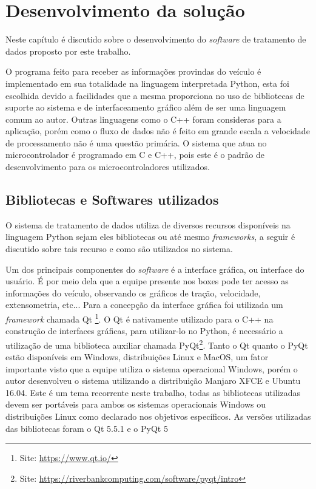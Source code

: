 \chapter{Desenvolvimento da solução}
	\label{ch:desenvolvimento}
Neste capítulo é discutido sobre o desenvolvimento do \textit{software} de tratamento de dados proposto por este trabalho. 

O programa feito para receber as informações provindas do veículo é implementado em sua totalidade na linguagem interpretada Python, esta foi escolhida devido a facilidades que a mesma proporciona no uso de bibliotecas de suporte ao sistema e de interfaceamento gráfico além de ser uma linguagem comum ao autor. Outras linguagens como o C++ foram consideras para a aplicação, porém como o fluxo de dados não é feito em grande escala a velocidade de processamento não é uma questão primária. O sistema que atua no microcontrolador é programado em C e C++, pois este é o padrão de desenvolvimento para os microcontroladores utilizados. 

\section{Bibliotecas e Softwares utilizados}
O sistema de tratamento de dados utiliza de diversos recursos disponíveis na linguagem Python sejam eles bibliotecas ou até mesmo \textit{frameworks}, a seguir é discutido sobre tais recurso e como são utilizados no sistema. 

Um dos principais componentes do \textit{software} é a interface gráfica, ou interface do usuário. É por meio dela que a equipe presente nos boxes pode ter acesso as informações do veículo, observando os gráficos de tração, velocidade, extensometria, etc... Para a concepção da interface gráfica foi utilizada um \textit{framework} chamada Qt \footnote[1]{Site: \url{https://www.qt.io/}}. O Qt é nativamente utilizado para o C++ na construção de interfaces gráficas, para utilizar-lo no Python, é necessário a utilização de uma biblioteca auxiliar chamada PyQt\footnote[2]{Site: \url{https://riverbankcomputing.com/software/pyqt/intro}}. Tanto o Qt quanto o PyQt estão disponíveis em Windows, distribuições Linux e MacOS, um fator importante visto que a equipe utiliza o sistema operacional Windows, porém o autor desenvolveu o sistema utilizando a distribuição Manjaro XFCE e Ubuntu 16.04. Este é um tema recorrente neste trabalho, todas as bibliotecas utilizadas devem ser portáveis para ambos os sistemas operacionais Windows ou distribuições Linux como declarado nos objetivos específicos. As versões utilizadas das bibliotecas foram o Qt 5.5.1 e o PyQt 5

